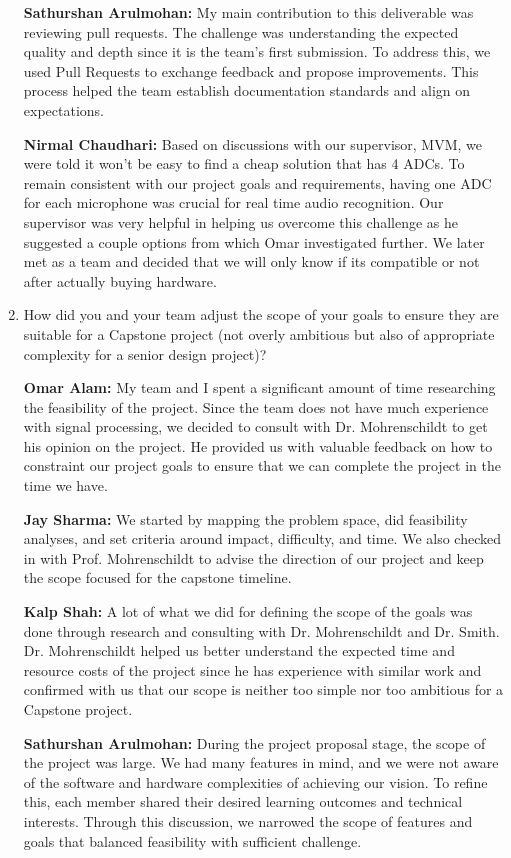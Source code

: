 \documentclass{article}
\begin{document}
\begin{enumerate}
    \textbf{Sathurshan Arulmohan:} My main contribution to this deliverable was reviewing pull requests.
    The challenge was understanding the expected quality and depth since it is the team's first submission.
    To address this, we used Pull Requests to exchange feedback and propose improvements.
    This process helped the team establish documentation standards and align on expectations.

    \textbf{Nirmal Chaudhari:} Based on discussions with our supervisor, MVM, we were told it won't be easy to find a cheap solution that has 4 ADCs.
    To remain consistent with our project goals and requirements, having one ADC for each microphone was crucial for real time audio recognition. 
    Our supervisor was very helpful in helping us overcome this challenge as he suggested a couple options from which Omar investigated further. 
    We later met as a team and decided that we will only know if its compatible or not after actually buying hardware. 

    \item How did you and your team adjust the scope of your goals to ensure
    they are suitable for a Capstone project (not overly ambitious but also of
    appropriate complexity for a senior design project)?

    \textbf{Omar Alam:} My team and I spent a significant amount of time researching the feasibility of the project. Since the team does not have much
    experience with signal processing, we decided to consult with Dr. Mohrenschildt to get his opinion on the project. He provided us with valuable feedback on how
    to constraint our project goals to ensure that we can complete the project in the time we have.
    
    \textbf{Jay Sharma:} We started by mapping the problem space, did feasibility analyses, and set criteria around impact, difficulty, and time. 
    We also checked in with Prof. Mohrenschildt to advise the direction of our project and keep the scope focused for the capstone timeline.

    \textbf{Kalp Shah:} A lot of what we did for defining the scope of the goals was done through research and consulting with Dr. Mohrenschildt and Dr. Smith.
    Dr. Mohrenschildt helped us better understand the expected time and resource costs of the project since he has experience with similar work and confirmed
    with us that our scope is neither too simple nor too ambitious for a Capstone project.

    \textbf{Sathurshan Arulmohan:} During the project proposal stage, the scope of the project was large.
    We had many features in mind, and we were not aware of the software and hardware complexities of achieving our vision.
    To refine this, each member shared their desired learning outcomes and technical interests.
    Through this discussion, we narrowed the scope of features and goals that balanced feasibility with sufficient challenge.


\end{enumerate}
\end{document}
